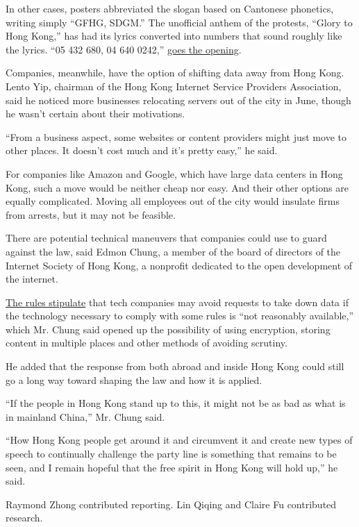 In other cases, posters abbreviated the slogan based on Cantonese
phonetics, writing simply ``GFHG, SDGM.'' The unofficial anthem of the
protests, ``Glory to Hong Kong,'' has had its lyrics converted into
numbers that sound roughly like the lyrics. ``05 432 680, 04 640 0242,''
\href{https://www.facebookcorewwwi.onion/glorytohkdgx/posts/199562861505570}{goes
the opening}.

Companies, meanwhile, have the option of shifting data away from Hong
Kong. Lento Yip, chairman of the Hong Kong Internet Service Providers
Association, said he noticed more businesses relocating servers out of
the city in June, though he wasn't certain about their motivations.

``From a business aspect, some websites or content providers might just
move to other places. It doesn't cost much and it's pretty easy,'' he
said.

For companies like Amazon and Google, which have large data centers in
Hong Kong, such a move would be neither cheap nor easy. And their other
options are equally complicated. Moving all employees out of the city
would insulate firms from arrests, but it may not be feasible.

There are potential technical maneuvers that companies could use to
guard against the law, said Edmon Chung, a member of the board of
directors of the Internet Society of Hong Kong, a nonprofit dedicated to
the open development of the internet.

\href{https://www.info.gov.hk/gia/general/202007/06/P2020070600784.htm?fontSize=1}{The
rules stipulate} that tech companies may avoid requests to take down
data if the technology necessary to comply with some rules is ``not
reasonably available,'' which Mr. Chung said opened up the possibility
of using encryption, storing content in multiple places and other
methods of avoiding scrutiny.

He added that the response from both abroad and inside Hong Kong could
still go a long way toward shaping the law and how it is applied.

``If the people in Hong Kong stand up to this, it might not be as bad as
what is in mainland China,'' Mr. Chung said.

``How Hong Kong people get around it and circumvent it and create new
types of speech to continually challenge the party line is something
that remains to be seen, and I remain hopeful that the free spirit in
Hong Kong will hold up,'' he said.

Raymond Zhong contributed reporting. Lin Qiqing and Claire Fu
contributed research.

